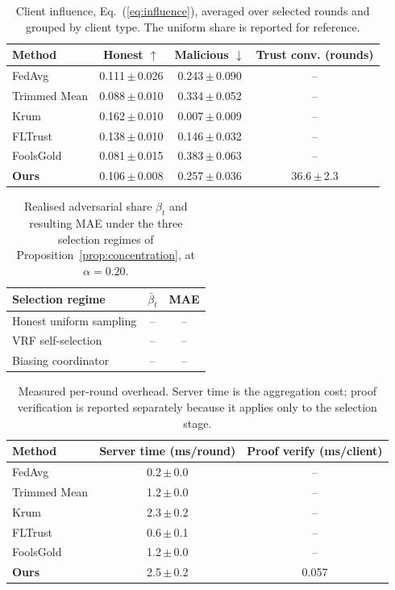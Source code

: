 \begin{table}[t]
\centering
\scriptsize
\caption{Client influence, Eq.~(\ref{eq:influence}), averaged over selected rounds and grouped by client type. The uniform share is reported for reference.}
\label{tab:trust_influence}
\setlength{\tabcolsep}{6pt}
\begin{tabular}{lccc}
\toprule
\textbf{Method} & \textbf{Honest $\uparrow$} & \textbf{Malicious $\downarrow$} & \textbf{Trust conv. (rounds)} \\
\midrule
FedAvg & 0.111\,$\pm$\,0.026 & 0.243\,$\pm$\,0.090 & -- \\
Trimmed Mean & 0.088\,$\pm$\,0.010 & 0.334\,$\pm$\,0.052 & -- \\
Krum & 0.162\,$\pm$\,0.010 & 0.007\,$\pm$\,0.009 & -- \\
FLTrust & 0.138\,$\pm$\,0.010 & 0.146\,$\pm$\,0.032 & -- \\
FoolsGold & 0.081\,$\pm$\,0.015 & 0.383\,$\pm$\,0.063 & -- \\
\textbf{Ours} & 0.106\,$\pm$\,0.008 & 0.257\,$\pm$\,0.036 & 36.6\,$\pm$\,2.3 \\
\bottomrule
\end{tabular}
\end{table}

\begin{table}[t]
\centering
\scriptsize
\caption{Realised adversarial share $\beta_t$ and resulting MAE under the three selection regimes of Proposition~\ref{prop:concentration}, at $\alpha=0.20$.}
\label{tab:selection}
\begin{tabular}{lcc}
\toprule
\textbf{Selection regime} & $\bar{\beta}_t$ & \textbf{MAE} \\
\midrule
Honest uniform sampling & -- & -- \\
VRF self-selection & -- & -- \\
Biasing coordinator & -- & -- \\
\bottomrule
\end{tabular}
\end{table}

\begin{table}[t]
\centering
\scriptsize
\caption{Measured per-round overhead. Server time is the aggregation cost; proof verification is reported separately because it applies only to the selection stage.}
\label{tab:overhead}
\setlength{\tabcolsep}{4pt}
\begin{tabular}{lcc}
\toprule
\textbf{Method} & \textbf{Server time (ms/round)} & \textbf{Proof verify (ms/client)} \\
\midrule
FedAvg & 0.2\,$\pm$\,0.0 & -- \\
Trimmed Mean & 1.2\,$\pm$\,0.0 & -- \\
Krum & 2.3\,$\pm$\,0.2 & -- \\
FLTrust & 0.6\,$\pm$\,0.1 & -- \\
FoolsGold & 1.2\,$\pm$\,0.0 & -- \\
\textbf{Ours} & 2.5\,$\pm$\,0.2 & 0.057 \\
\bottomrule
\end{tabular}
\end{table}

